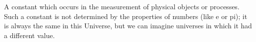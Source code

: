 A constant which occurs in the measurement of physical objects or processes.
Such a constant is not determined by the properties of numbers (like e or pi); it
is always the same in this Universe, but we can imagine universes in which 
it had a different value.